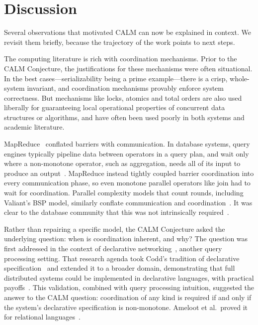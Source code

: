 \section{Discussion}
\label{sec:discussion}

Several observations that motivated CALM can now be explained
in context. We revisit them briefly, because the
trajectory of the work points to next steps.

The computing literature is rich with coordination mechanisms. Prior to the CALM
Conjecture, the justifications for these mechanisms were often situational. In
the best cases---serializability being a prime example---there is a crisp,
whole-system invariant, and coordination mechanisms provably enforce system
correctness. But mechanisms like locks, atomics and total orders are also used
liberally for guaranteeing local operational properties of concurrent data
structures or algorithms, and have often been used poorly in both systems and
academic literature.

MapReduce~\cite{dean2004mapreduce} conflated barriers with communication. In database systems, query
engines typically pipeline data between operators in a query plan, and wait only
where a non-monotone operator, such as aggregation, needs all of its input to
produce an output~\cite{wilschut1991dataflow,graefe1990volcano}. MapReduce
instead tightly coupled barrier coordination into every communication phase,
so even monotone parallel operators like join had to wait for coordination.
Parallel complexity models that count rounds, including Valiant's BSP model,
similarly conflate communication and
coordination~\cite{valiant1990bsp,karloff2010mrc}. It was clear to the database
community that this was not intrinsically
required~\cite{dewitt2008mapreduce,condie2010online}.

Rather than repairing a specific model, the CALM Conjecture asked the underlying
question: when is coordination inherent, and why? The question was
first addressed in the context of declarative
networking~\cite{loo2009declarative}, another query processing setting. That
research agenda took Codd's tradition of declarative
specification~\cite{codd1970relational} and extended it to a broader domain,
demonstrating that full distributed systems could be implemented in declarative
languages, with practical
payoffs~\cite{loo2005overlays,loo2009declarative,chu2007declarative,alvaro2010boom,alvaro2011bloom}.
This validation, combined with query processing intuition, suggested the answer
to the CALM question: coordination of any kind is required if and only if the
system's declarative specification is non-monotone. Ameloot et al.\ proved it
for relational languages~\cite{ameloot2013relational}.

